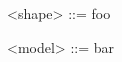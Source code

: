 \documentclass{article}
\begin{document}
\begin{grammar}
<shape> ::= foo
\vspace{0em}

<model> ::= bar
\end{grammar}
\end{document}
